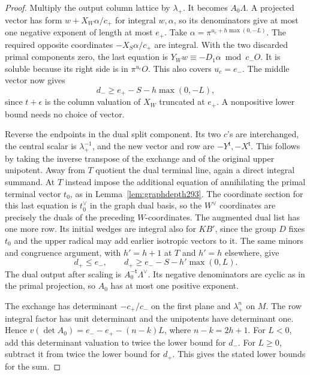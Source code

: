 \documentclass[a4paper,11pt]{article}
\theoremstyle{definition}
\theoremstyle{remark}
\numberwithin{equation}{section}
\begin{document}
\begin{proof}
Multiply the output column lattice by \(\lambda_+\).
It becomes \(A_0\Lambda\). A projected vector has form
\(w+X_W\alpha/c_+\) for integral \(w,\alpha\), so its
denominators give at most one negative exponent of length
at most \(e_+\). Take \(\alpha=\pi^{u_c+h\max(0,-L)}\).
The required opposite coordinates \(-X_S\alpha/c_+\)
are integral. With the two discarded primal components
zero, the last equation is
\(Y_W w\equiv-D_1\alpha\bmod c_-O\). It is soluble
because its right side is in \(\pi^{u_c}O\). This also
covers \(u_c=e_-\). The middle vector now gives
\[
              d_-\ge e_+-S-h\max(0,-L),
\]
since \(t+\epsilon\) is the column valuation of \(X_W\)
truncated at \(e_+\). A nonpositive lower bound needs
no choice of vector.

Reverse the endpoints in the dual split component. Its
two \(c\)'s are interchanged, the central scalar is
\(\lambda_+^{-1}\), and the new vector and row are
\(-Y^{\mathsf t},-X^{\mathsf t}\). This follows by taking
the inverse transpose of the exchange and of the original
upper unipotent. Away from \(T\) quotient the dual terminal
line, again a direct integral summand. At \(T\) instead
impose the additional equation of annihilating the primal
terminal vector \(t_0\), as in Lemma~\ref{lem:graphdepth293}.
The coordinate section for this last equation is
\(t_0^\vee\) in the graph dual basis, so the \(W^\vee\)
coordinates are precisely the duals of the preceding
\(W\)-coordinates. The augmented dual list has one more
row. Its initial wedges are integral also for \(KB'\),
since the group \(D\) fixes \(t_0\) and the upper radical may
add earlier isotropic vectors to it. The same minors
and congruence argument, with \(h'=h+1\) at \(T\) and
\(h'=h\) elsewhere, give
\[
      d_+\le e_-,\qquad
      d_+\ge e_--S-h'\max(0,L).
\]
The dual output after scaling is \(A_0^{-{\mathsf t}}\Lambda^\vee\).
Its negative denominators are cyclic as in the primal
projection, so \(A_0\) has at most one positive exponent.

The exchange has determinant \(-c_+/c_-\) on the first
plane and \(\lambda_+^n\) on \(M\). The row integral
factor has unit determinant and the unipotents have
determinant one. Hence
\(v(\det A_0)=e_--e_+-(n-k)L\), where \(n-k=2h+1\).
For \(L<0\), add this determinant valuation to twice
the lower bound for \(d_-\). For \(L\ge0\), subtract it
from twice the lower bound for \(d_+\). This gives the
stated lower bounds for the sum.
\end{proof}
\end{document}
